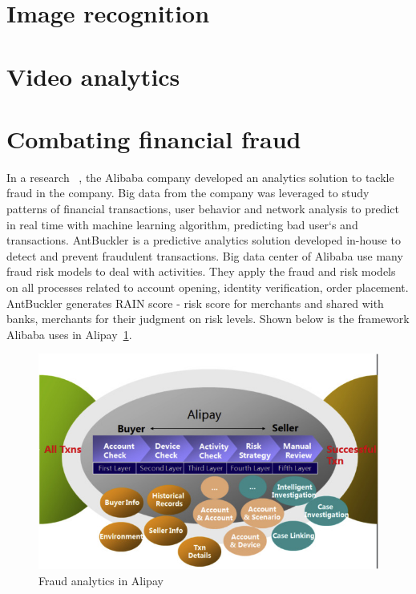 \section{Image recognition}



\section{Video analytics}



\setlength{\footskip}{8mm}


\newpage
\section{Combating financial fraud}
In a research~ , the Alibaba company developed an analytics solution to tackle fraud in the company. Big data from the company was leveraged to study patterns of financial transactions, user behavior and network analysis to predict in real time with machine learning algorithm, predicting bad user`s and transactions. AntBuckler is a predictive analytics solution developed in-house to detect and prevent fraudulent transactions. Big data center of Alibaba use many fraud risk models to deal with activities. They apply the fraud and risk models on all processes related to account opening, identity verification, order placement. AntBuckler generates RAIN score - risk score for merchants and shared with banks, merchants for their judgment on risk levels.
\newline
Shown below is the framework Alibaba uses in Alipay~\ref{fig:alipay}.

\begin{figure}[H]
	\includegraphics[scale = 0.8]{figures/alipay.jpg}
	\centering
	\caption{Fraud analytics in Alipay}
	\label{fig:alipay}
\end{figure}

